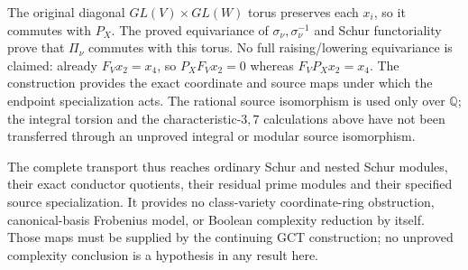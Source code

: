 The original diagonal $GL(V)\times GL(W)$ torus preserves each
$x_i$, so it commutes with $P_X$. The proved equivariance of
$\sigma_\nu,\sigma_\nu^{-1}$ and Schur functoriality prove that $\Pi_\nu$ commutes
with this torus. No full raising/lowering equivariance is claimed:
already $F_Vx_2=x_4$, so $P_XF_Vx_2=0$ whereas
$F_VP_Xx_2=x_4$. The construction provides the exact coordinate
and source maps under which the endpoint specialization acts.
The rational source isomorphism is used only over $\mathbb Q$;
the integral torsion and the characteristic-$3,7$ calculations
above have not been transferred through an unproved integral or
modular source isomorphism.

The complete transport thus reaches ordinary Schur and nested Schur
modules, their exact conductor quotients, their residual prime
modules and their specified source specialization. It provides no
class-variety coordinate-ring obstruction, canonical-basis
Frobenius model, or Boolean complexity reduction by itself. Those
maps must be supplied by the continuing GCT construction; no
unproved complexity conclusion is a hypothesis in any result here.
